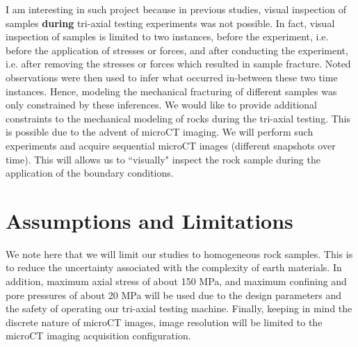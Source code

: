 \documentclass[12pt]{article}
\begin{document}
I am interesting in such project because in previous studies, visual inspection of samples \textbf{during} tri-axial testing experiments was not possible. In fact, visual inspection of samples is limited to two instances, before the experiment, i.e. before the application of stresses or forces, and after conducting the experiment, i.e. after removing the stresses or forces which resulted in sample fracture. Noted observations were then used to infer what occurred in-between these two time instances. Hence, modeling the mechanical fracturing of different samples was only constrained by these inferences. We would like to provide additional constraints to the mechanical modeling of rocks during the tri-axial testing. This is possible due to the advent of microCT imaging. We will perform such experiments and acquire sequential microCT images (different snapshots over time). This will allows us to ``visually" inspect the rock sample during the application of the boundary conditions.

\section{Assumptions and Limitations}
We note here that we will limit our studies to homogeneous rock samples. This is to reduce the uncertainty associated with the complexity of earth materials. In addition, maximum axial stress of about 150 MPa, and maximum confining and pore pressures of about 20 MPa will be used due to the design parameters and the safety of operating our tri-axial testing machine. Finally, keeping in mind the discrete nature of microCT images, image resolution will be limited to the microCT imaging acquisition configuration. 
\end{document}
